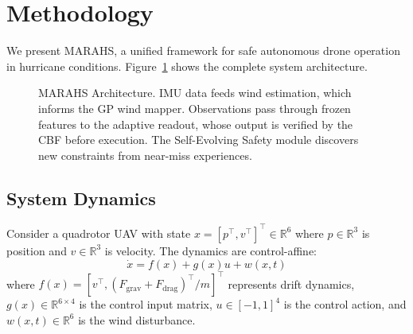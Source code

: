 \section{Methodology}

\label{sec:methodology}

We present MARAHS, a unified framework for safe autonomous drone operation in hurricane conditions. Figure~\ref{fig:architecture} shows the complete system architecture.

\begin{figure}[t]
\centering
{}
\caption{MARAHS Architecture. IMU data feeds wind estimation, which informs the GP wind mapper. Observations pass through frozen features to the adaptive readout, whose output is verified by the CBF before execution. The Self-Evolving Safety module discovers new constraints from near-miss experiences.}
\label{fig:architecture}
\end{figure}

\subsection{System Dynamics}

Consider a quadrotor UAV with state $x = [p^\top, v^\top]^\top \in \mathbb{R}^6$ where $p \in \mathbb{R}^3$ is position and $v \in \mathbb{R}^3$ is velocity. The dynamics are control-affine:
\begin{equation}
    \dot{x} = f(x) + g(x)u + w(x,t)
\end{equation}
where $f(x) = [v^\top, (F_{\text{grav}} + F_{\text{drag}})^\top/m]^\top$ represents drift dynamics, $g(x) \in \mathbb{R}^{6 \times 4}$ is the control input matrix, $u \in [-1,1]^4$ is the control action, and $w(x,t) \in \mathbb{R}^6$ is the wind disturbance.

